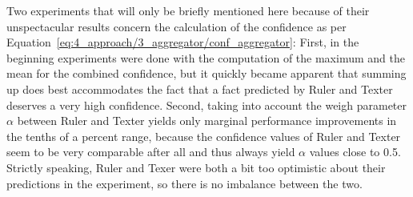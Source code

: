 Two experiments that will only be briefly mentioned here because of their unspectacular results concern the calculation of the confidence as per Equation~\ref{eq:4_approach/3_aggregator/conf_aggregator}: First, in the beginning experiments were done with the computation of the maximum and the mean for the combined confidence, but it quickly became apparent that summing up does best accommodates the fact that a fact predicted by Ruler and Texter deserves a very high confidence. Second, taking into account the weigh parameter $\alpha$ between Ruler and Texter yields only marginal performance improvements in the tenths of a percent range, because the confidence values of Ruler and Texter seem to be very comparable after all and thus always yield $\alpha$ values close to 0.5. Strictly speaking, Ruler and Texer were both a bit too optimistic about their predictions in the experiment, so there is no imbalance between the two.
